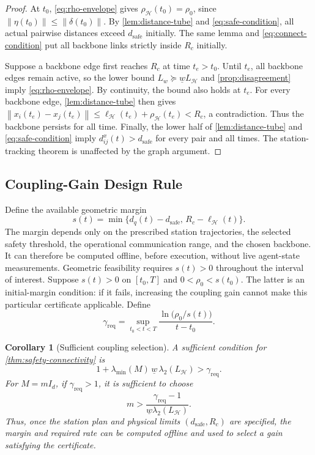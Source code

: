 \documentclass[letterpaper,10pt,conference]{ieeeconf}
\newcommand{\norm}[1]{\left\lVert #1 \right\rVert}
\newcommand{\dsafe}{d_{\mathrm{safe}}}
\newcommand{\Rc}{R_c}
\newcommand{\rhoH}{\rho_{\mathcal H}}
\newcommand{\ellH}{\ell_{\mathcal H}}
\newcommand{\gamreq}{\gamma_{\mathrm{req}}}
\newtheorem{corollary}{Corollary}
\begin{document}
\begin{proof}
At $t_0$, \eqref{eq:rho-envelope} gives $\rhoH(t_0)=\rho_0$, since $\norm{\eta(t_0)}\leq\norm{\delta(t_0)}$. By \cref{lem:distance-tube} and \eqref{eq:safe-condition}, all actual pairwise distances exceed $\dsafe$ initially. The same lemma and \eqref{eq:connect-condition} put all backbone links strictly inside $\Rc$ initially.

Suppose a backbone edge first reaches $\Rc$ at time $t_e>t_0$. Until $t_e$, all backbone edges remain active, so the lower bound $L_w\succeq\underline wL_{\mathcal H}$ and \cref{prop:disagreement} imply \eqref{eq:rho-envelope}. By continuity, the bound also holds at $t_e$. For every backbone edge, \cref{lem:distance-tube} then gives $\norm{x_i(t_e)-x_j(t_e)}\leq\ellH(t_e)+\rhoH(t_e)<\Rc$, a contradiction. Thus the backbone persists for all time. Finally, the lower half of \cref{lem:distance-tube} and \eqref{eq:safe-condition} imply $d_{ij}^x(t)>\dsafe$ for every pair and all times. The station-tracking theorem is unaffected by the graph argument.\end{proof}

\subsection{Coupling-Gain Design Rule}
Define the available geometric margin
\begin{equation}
  s(t)=\min\{d_q(t)-\dsafe,\,\Rc-\ellH(t)\}.
  \label{eq:margin}
\end{equation}
The margin depends only on the prescribed station trajectories, the selected safety threshold, the operational communication range, and the chosen backbone. It can therefore be computed offline, before execution, without live agent-state measurements. Geometric feasibility requires $s(t)>0$ throughout the interval of interest. Suppose $s(t)>0$ on $[t_0,T]$ and $0<\rho_0<s(t_0)$. The latter is an initial-margin condition: if it fails, increasing the coupling gain cannot make this particular certificate applicable. Define
\begin{equation}
  \gamreq=\sup_{t_0<t<T}\frac{\ln\big(\rho_0/s(t)\big)}{t-t_0}.
  \label{eq:required-rate}
\end{equation}

\begin{corollary}[Sufficient coupling selection]
\label{cor:gain}
A sufficient condition for \cref{thm:safety-connectivity} is
\begin{equation}
  1+\lambda_{\min}(M)\,\underline w\,\lambda_2(L_{\mathcal H})>\gamreq.
  \label{eq:gain-condition}
\end{equation}
For $M=mI_d$, if $\gamreq>1$, it is sufficient to choose
\begin{equation}
 m>\frac{\gamreq-1}{\underline w\lambda_2(L_{\mathcal H})}.
 \label{eq:gain-explicit}
\end{equation}
Thus, once the station plan and physical limits $(d_{\mathrm{safe}},R_c)$ are specified, the margin and required rate can be computed offline and used to select a gain satisfying the certificate.
\end{corollary}
\end{document}
